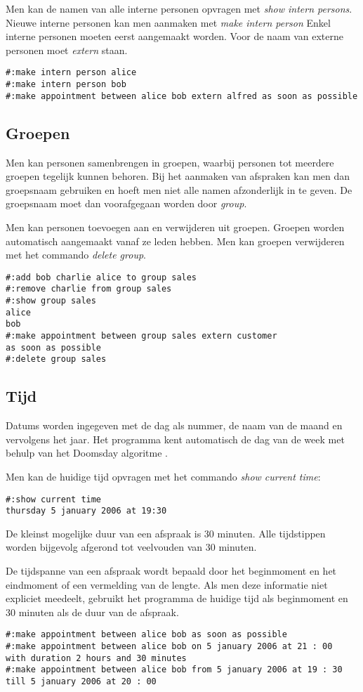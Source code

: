 \documentclass[a4paper]{article}
\begin{document}
Men kan de namen van alle interne personen opvragen met {\em show intern persons}.
Nieuwe interne personen kan men aanmaken met {\em make intern person}
Enkel interne personen moeten eerst aangemaakt worden.
Voor de naam van externe personen moet {\em extern} staan.

\begin{verbatim}
#:make intern person alice
#:make intern person bob
#:make appointment between alice bob extern alfred as soon as possible
\end{verbatim}

\subsection{Groepen}
Men kan personen samenbrengen in groepen, waarbij personen tot meerdere groepen tegelijk kunnen behoren.
Bij het aanmaken van afspraken kan men dan groepsnaam gebruiken en hoeft men niet alle namen afzonderlijk in te geven.
De groepsnaam moet dan voorafgegaan worden door {\em group}.

Men kan personen toevoegen aan en verwijderen uit groepen.
Groepen worden automatisch aangemaakt vanaf ze leden hebben.
Men kan groepen verwijderen met het commando {\em delete group}.

\begin{verbatim}
#:add bob charlie alice to group sales
#:remove charlie from group sales
#:show group sales
alice
bob
#:make appointment between group sales extern customer 
as soon as possible
#:delete group sales
\end{verbatim}

\subsection{Tijd}
Datums worden ingegeven met de dag als nummer, de naam van de maand en vervolgens het jaar.
Het programma kent automatisch de dag van de week met behulp van het Doomsday algoritme \cite{doomsday}.

Men kan de huidige tijd opvragen met het commando {\em show current time}:
\begin{verbatim}
#:show current time
thursday 5 january 2006 at 19:30 
\end{verbatim}

De kleinst mogelijke duur van een afspraak is 30 minuten.
Alle tijdstippen worden bijgevolg afgerond tot veelvouden van 30 minuten.

De tijdspanne van een afspraak wordt bepaald door het beginmoment en het eindmoment of een vermelding van de lengte.
Als men deze informatie niet expliciet meedeelt, gebruikt het programma de huidige tijd als beginmoment en 30 minuten als de duur van de afspraak.
\begin{verbatim}
#:make appointment between alice bob as soon as possible
#:make appointment between alice bob on 5 january 2006 at 21 : 00 
with duration 2 hours and 30 minutes
#:make appointment between alice bob from 5 january 2006 at 19 : 30 
till 5 january 2006 at 20 : 00
\end{verbatim}
\end{document}
